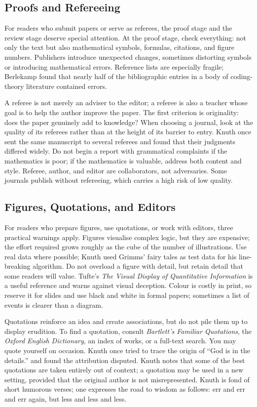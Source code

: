 \documentclass[11pt]{article}
\begin{document}
\subsection{Proofs and Refereeing}

For readers who submit papers or serve as referees, the proof stage and the review stage deserve special attention. At the proof stage, check everything: not only the text but also mathematical symbols, formulas, citations, and figure numbers. Publishers introduce unexpected changes, sometimes distorting symbols or introducing mathematical errors. Reference lists are especially fragile; Berlekamp found that nearly half of the bibliographic entries in a body of coding-theory literature contained errors.

A referee is not merely an adviser to the editor; a referee is also a teacher whose goal is to help the author improve the paper. The first criterion is originality: does the paper genuinely add to knowledge? When choosing a journal, look at the quality of its referees rather than at the height of its barrier to entry. Knuth once sent the same manuscript to several referees and found that their judgments differed widely. Do not begin a report with grammatical complaints if the mathematics is poor; if the mathematics is valuable, address both content and style. Referee, author, and editor are collaborators, not adversaries. Some journals publish without refereeing, which carries a high risk of low quality.

\subsection{Figures, Quotations, and Editors}

For readers who prepare figures, use quotations, or work with editors, three practical warnings apply. Figures visualise complex logic, but they are expensive; the effort required grows roughly as the cube of the number of illustrations. Use real data where possible; Knuth used Grimms' fairy tales as test data for his line-breaking algorithm. Do not overload a figure with detail, but retain detail that some readers will value. Tufte's \emph{The Visual Display of Quantitative Information} is a useful reference and warns against visual deception. Colour is costly in print, so reserve it for slides and use black and white in formal papers; sometimes a list of events is clearer than a diagram.

Quotations reinforce an idea and create associations, but do not pile them up to display erudition. To find a quotation, consult \emph{Bartlett's Familiar Quotations}, the \emph{Oxford English Dictionary}, an index of works, or a full-text search. You may quote yourself on occasion. Knuth once tried to trace the origin of ``God is in the details.'' and found the attribution disputed. Knuth notes that some of the best quotations are taken entirely out of context; a quotation may be used in a new setting, provided that the original author is not misrepresented. Knuth is fond of short humorous verses; one expresses the road to wisdom as follows: err and err and err again, but less and less and less.
\end{document}
